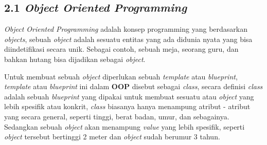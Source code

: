 \documentclass[a4paper]{article}
\begin{document}
\subsection*{2.1 \textit{Object Oriented Programming}}
\textit{Object Oriented Programming} adalah konsep programming yang berdasarkan \textit{objects}, sebuah \textit{object} adalah sesuatu entitas yang ada didunia nyata yang bisa diindetifikasi secara unik\autocite{liang_liang_2021}. Sebagai contoh, sebuah meja, seorang guru, dan bahkan hutang bisa dijadikan sebagai \textit{object}.

Untuk membuat sebuah \textit{object} diperlukan sebuah \textit{template} atau \textit{blueprint}, \textit{template} atau \textit{blueprint} ini dalam \textbf{OOP} disebut sebagai \textit{class}, secara definisi \textit{class} adalah sebuah \textit{blueprint} yang dipakai untuk membuat sesuatu atau \textit{object} yang lebih spesifik atau konkrit\autocite{education-erin-oop-2020}, \textit{class} biasanya hanya menampung atribut - atribut yang secara general, seperti tinggi, berat badan, umur, dan sebagainya. Sedangkan sebuah \textit{object} akan menampung \textit{value} yang lebih spesifik, seperti \textit{object} tersebut bertinggi 2 meter dan \textit{object} sudah berumur 3 tahun.
\end{document}

